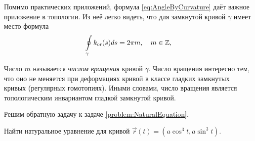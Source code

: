 Помимо практических приложений, формула \eqref{eq:AngleByCurvature} даёт важное приложение в топологии. Из неё легко видеть, что для замкнутой кривой $\gamma$ имеет место формула
\begin{equation} \label{eq:HomoTopInvariant}
	\oint\limits_{\gamma}k_{\mathrm{or}}(s)ds = 2\pi m,\quad m \in \mathbb{Z},
\end{equation}

Число $m$ называется \textit{числом вращения} кривой $\gamma$. Число вращения интересно тем, что оно не меняется при деформациях кривой в классе гладких замкнутых кривых (регулярных гомотопиях). Иными словами, число вращения является топологическим инвариантом гладкой замкнутой кривой.

Решим обратную задачу к задаче \ref{problem:NaturalEquation}.

\begin{problem}
	Найти натуральное уравнение для кривой $\vec{r}(t) = (a\cos^3t, a\sin^3t)$.
\end{problem}

